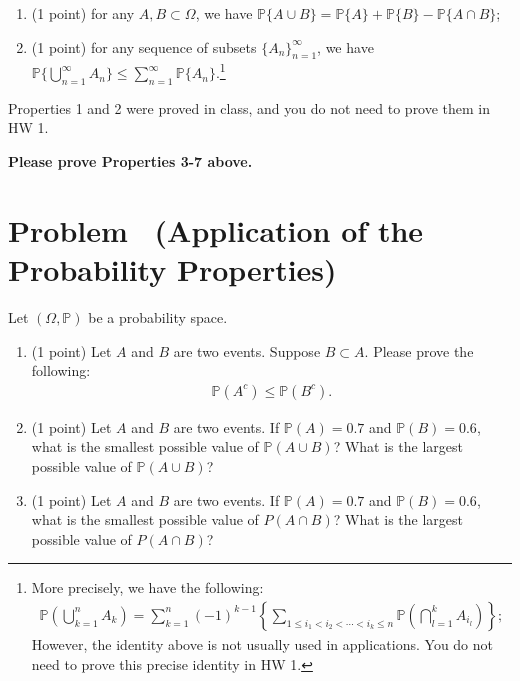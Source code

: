\documentclass[11pt]{article}
\newcounter{pppp}
\newcommand{\prob}{\arabic{pppp}} %
\newcommand{\increase}{\addtocounter{pppp}{1}} %
\newcommand{\newproblem}[2]{
    \increase
    \section*{Problem \prob~(#1) \hfill {#2}}
}
\begin{document}
\begin{enumerate}
    \item (1 point) for any $A,B\subset\Omega$, we have $\mathbb{P}\{A\cup B\}=\mathbb{P}\{A\}+\mathbb{P}\{B\}-\mathbb{P}\{A\cap B\}$;
    \item (1 point) for any sequence of subsets $\{A_n\}_{n=1}^\infty$, we have $\mathbb{P}\{\bigcup_{n=1}^\infty A_n\}\le\sum_{n=1}^\infty\mathbb{P}\{A_n\}$.\footnote{More precisely, we have the following: 
    \begin{align*}
      \mathbb{P}\left(\bigcup_{k=1}^n A_k\right)=\sum_{k=1}^n(-1)^{k-1}\left\{\sum_{1\le i_1<i_2<\cdots<i_k\le n} \mathbb{P}\left(\bigcap_{l=1}^k A_{i_l}\right)\right\};  
    \end{align*}
    However, the identity above is not usually used in applications. You do not need to prove this precise identity in HW 1.}
\end{enumerate}

Properties 1 and 2 were proved in class, and you do not need to prove them in HW 1. 

\textbf{Please prove Properties 3-7 above. }



\newproblem{Application of the Probability Properties}{ }

Let $(\Omega, \mathbb{P})$ be a probability space.

\begin{enumerate}
\item (1 point) Let $A$ and $B$ are two events. Suppose $B\subset A$. Please prove the following:
\begin{align*}
\mathbb{P}(A^c) \le \mathbb{P}(B^c).
\end{align*}

\item (1 point) Let $A$ and $B$ are two events. If $\mathbb{P}(A) = 0.7$ and $\mathbb{P}(B)=0.6$,  what is the smallest possible value of $\mathbb{P}(A\cup B)$? What is the largest possible value of $\mathbb{P}(A\cup B)$? 

\item (1 point) Let $A$ and $B$ are two events. If $\mathbb{P}(A) = 0.7$ and $\mathbb{P}(B)=0.6$, what is the smallest possible value of $P(A\cap B)$? What is the largest possible value of $P(A\cap B)$? 


\end{enumerate}
\end{document}
